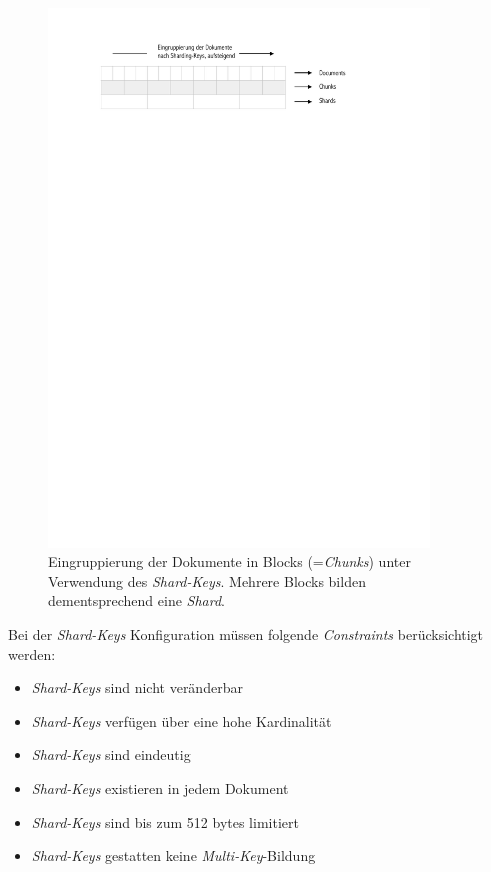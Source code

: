 \begin{figure}[H]
\centering
 \includegraphics[trim = 25mm 240mm 40mm 20mm, clip, width=0.9\textwidth]{resources/replicaSet/sharding-keys}
\caption[Eingruppierung der Dokumente in Blocks (=\textit{Chunks}) unter Verwendung des \textit{Shard-Keys}. Mehrere Blocks bilden dementsprechend eine \textit{Shard}.]{Eingruppierung der Dokumente in Blocks (=\textit{Chunks}) unter Verwendung des \textit{Shard-Keys}. Mehrere Blocks bilden dementsprechend eine \textit{Shard}.}
\label{img:shardKeys}
\end{figure}

Bei der \textit{Shard-Keys} Konfiguration müssen folgende \textit{Constraints}  \cite{sharding} berücksichtigt werden:
\begin{itemize}
\item \textit{Shard-Keys} sind nicht veränderbar
\item \textit{Shard-Keys} verfügen über eine hohe Kardinalität
\item \textit{Shard-Keys} sind eindeutig
\item \textit{Shard-Keys} existieren in jedem Dokument
\item \textit{Shard-Keys} sind bis zum 512 bytes limitiert
\item \textit{Shard-Keys} gestatten keine \textit{Multi-Key}-Bildung
\end{itemize}

